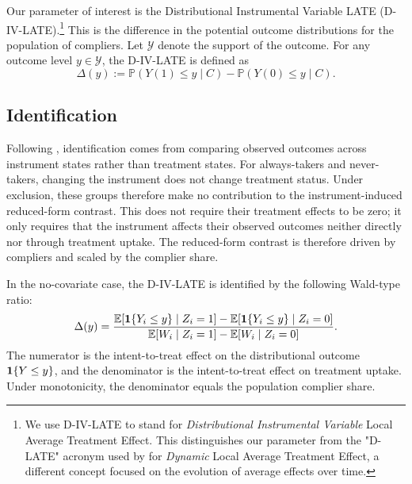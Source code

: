 \documentclass[final,3p,fleqn, 10pt]{elsarticle}
\begin{document}
Our parameter of interest is the Distributional Instrumental Variable LATE (D-IV-LATE).\footnote{We use D-IV-LATE to stand for \textit{Distributional Instrumental Variable} Local Average Treatment Effect. This distinguishes our parameter from the "D-LATE" acronym used by \citet{hoagland2020who} for \textit{Dynamic} Local Average Treatment Effect, a different concept focused on the evolution of average effects over time.} This is the difference in the potential outcome distributions for the population of compliers. Let $\mathcal{Y}$ denote the support of the outcome. For any outcome level $y \in \mathcal{Y}$, the D-IV-LATE is defined as
\begin{equation} \label{eq:dlate_def}
\Delta(y) := \mathbb{P}(Y(1) \le y \mid C) - \mathbb{P}(Y(0) \le y \mid C).
\end{equation}

\subsection{Identification}

Following \citet{imbens1994}, identification comes from comparing observed outcomes across instrument states rather than treatment states. For always-takers and never-takers, changing the instrument does not change treatment status. Under exclusion, these groups therefore make no contribution to the instrument-induced reduced-form contrast. This does not require their treatment effects to be zero; it only requires that the instrument affects their observed outcomes neither directly nor through treatment uptake. The reduced-form contrast is therefore driven by compliers and scaled by the complier share.

In the no-covariate case, the D-IV-LATE is identified by the following Wald-type ratio:
\begin{equation} \label{eq:dlate_identification}
\Delta(y) = \frac{\mathbb{E}[\mathbf{1}\{Y_i \le y\} \mid Z_i=1] - \mathbb{E}[\mathbf{1}\{Y_i \le y\} \mid Z_i=0]}{\mathbb{E}[W_i \mid Z_i=1] - \mathbb{E}[W_i \mid Z_i=0]}.
\end{equation}
The numerator is the intent-to-treat effect on the distributional outcome $\mathbf{1}\{Y \le y\}$, and the denominator is the intent-to-treat effect on treatment uptake. Under monotonicity, the denominator equals the population complier share.
\end{document}
